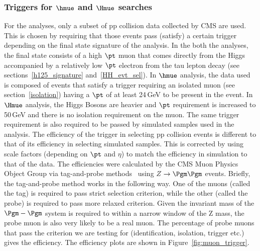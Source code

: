 \subsubsection{Triggers for $\hmue$ and $\Hmue$ searches}
\label{anal_trigger}
For the analyses, only a subset of pp collision data collected by CMS are used. This is chosen by requiring that those events pass (satisfy) a certain trigger depending on the final state signature of the analysis. In the both the analyses, the final state consists of a high $\pt$ muon that comes directly from the Higgs accompanied by a relatively low $\pt$ electron from the tau lepton decay (see sections~\ref{h125_signature} and~\ref{HH_evt_sel}). In $\hmue$ analysis, the data used is composed of events that satisfy a trigger requiring an isolated muon (see section~\ref{isolation}) having a $\pt$ of at least 24\,GeV to be present in the event. In $\Hmue$ analysis, the Higgs Bosons are heavier and $\pt$ requirement is increased to 50\,GeV and there is no isolation requirement on the muon. The same trigger requirement is also required to be passed by simulated samples used in the analysis. The efficiency of the trigger in selecting pp collision events is different to that of its efficiency in selecting simulated samples. This is corrected by using scale factors (depending on $\pt$ and $\eta$) to match the efficiency in simulation to that of the data. The efficiencies were calculated by the CMS Muon Physics Object Group via tag-and-probe methods~\cite{muon_recon2018} using $Z\rightarrow\Pgm\Pgm$ events. Briefly, the tag-and-probe method works in the following way. One of the muons (called the tag) is required to pass strict selection criterion, while the other (called the probe) is required to pass more relaxed criterion. Given the invariant mass of the $\Pgm-\Pgm$ system is required to within a narrow window of the Z mass, the probe muon is also very likely to be a real muon. The percentage of probe muons that pass the criterion we are testing for (identification, isolation, trigger etc.) gives the efficiency. The efficiency plots are shown in Figure~\ref{fig:muon_trigger}.

